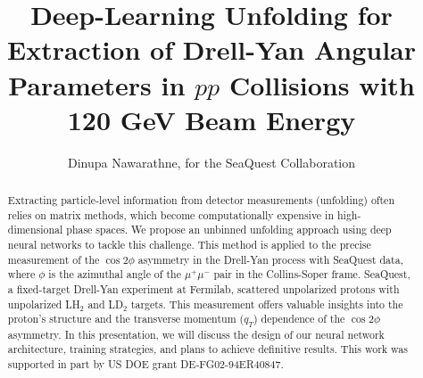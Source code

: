 \documentclass{article}
\title{Deep-Learning Unfolding for Extraction of Drell-Yan Angular Parameters in $pp$ Collisions with 120 GeV Beam Energy}
\author{Dinupa Nawarathne, for the SeaQuest Collaboration}
\begin{document}
\maketitle

\begin{abstract}
Extracting particle-level information from detector measurements (unfolding) often relies on matrix methods, which become computationally expensive in high-dimensional phase spaces. We propose an unbinned unfolding approach using deep neural networks to tackle this challenge. This method is applied to the precise measurement of the $\cos2\phi$ asymmetry in the Drell-Yan process with SeaQuest data, where $\phi$ is the azimuthal angle of the $\mu^{+}\mu^{-}$ pair in the Collins-Soper frame. SeaQuest, a fixed-target Drell-Yan experiment at Fermilab, scattered unpolarized protons with unpolarized LH$_{2}$ and LD$_{2}$ targets. This measurement offers valuable insights into the proton's structure and the transverse momentum ($q_{T}$) dependence of the $\cos2\phi$ asymmetry. In this presentation, we will discuss the design of our neural network architecture, training strategies, and plans to achieve definitive results. This work was supported in part by US DOE grant DE-FG02-94ER40847.
\end{abstract}
\end{document}
